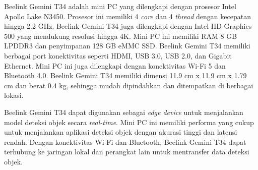Beelink Gemini T34 adalah mini PC yang dilengkapi dengan prosesor Intel Apollo Lake N3450. Prosesor ini memiliki 4 \emph{core} dan 4 \emph{thread} dengan kecepatan hingga 2.2 GHz. Beelink Gemini T34 juga dilengkapi dengan Intel HD Graphics 500 yang mendukung resolusi hingga 4K. Mini PC ini memiliki RAM 8 GB LPDDR3 dan penyimpanan 128 GB eMMC SSD. Beelink Gemini T34 memiliki berbagai port konektivitas seperti HDMI, USB 3.0, USB 2.0, dan Gigabit Ethernet. Mini PC ini juga dilengkapi dengan konektivitas Wi-Fi 5 dan Bluetooth 4.0. Beelink Gemini T34 memiliki dimensi 11.9 cm x 11.9 cm x 1.79 cm dan berat 0.4 kg, sehingga mudah dipindahkan dan ditempatkan di berbagai lokasi. \parencite*{beelinkGeminiT34}

Beelink Gemini T34 dapat digunakan sebagai \emph{edge device} untuk menjalankan model deteksi objek secara \emph{real-time}. Mini PC ini memiliki performa yang cukup untuk menjalankan aplikasi deteksi objek dengan akurasi tinggi dan latensi rendah. Dengan konektivitas Wi-Fi dan Bluetooth, Beelink Gemini T34 dapat terhubung ke jaringan lokal dan perangkat lain untuk mentransfer data deteksi objek.

